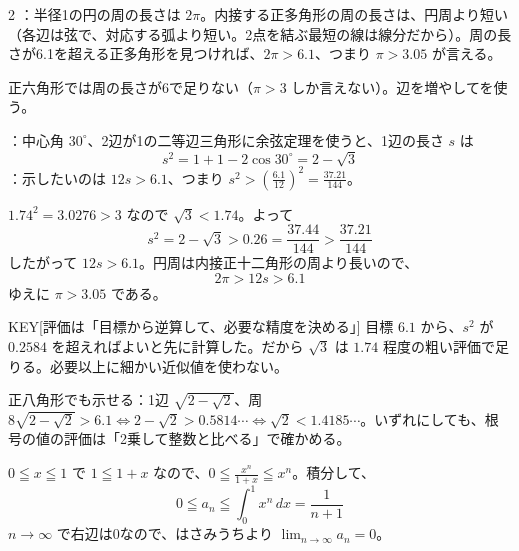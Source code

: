 \documentclass[paper=b5j, fontsize=8pt, fleqn, twoside]{jlreq}
\begin{document}
\begin{multicols*}{2}
  ：半径1の円の周の長さは $2\pi$。内接する正多角形の周の長さは、円周より短い（各辺は弦で、対応する弧より短い。2点を結ぶ最短の線は線分だから）。周の長さが6.1を超える正多角形を見つければ、$2\pi>6.1$、つまり $\pi>3.05$ が言える。\par
  正六角形では周の長さが6で足りない（$\pi>3$ しか言えない）。辺を増やしてを使う。

  \begin{zuhyo}
  \end{zuhyo}

  ：中心角 $30^\circ$、2辺が1の二等辺三角形に余弦定理を使うと、1辺の長さ $s$ は
  \[s^2=1+1-2\cos30^\circ=2-\sqrt3\]
  ：示したいのは $12s>6.1$、つまり $s^2>\left(\frac{6.1}{12}\right)^2=\frac{37.21}{144}$。\par
  $1.74^2=3.0276>3$ なので $\sqrt3<1.74$。よって
  \[s^2=2-\sqrt3>0.26=\frac{37.44}{144}>\frac{37.21}{144}\]
  したがって $12s>6.1$。円周は内接正十二角形の周より長いので、
  \[2\pi>12s>6.1\]
  ゆえに $\pi>3.05$ である。\QED

  \begin{ptbs}{KEY}[評価は「目標から逆算して、必要な精度を決める」]
    目標 $6.1$ から、$s^2$ が $0.2584$ を超えればよいと先に計算した。だから $\sqrt3$ は $1.74$ 程度の粗い評価で足りる。必要以上に細かい近似値を使わない。
  \end{ptbs}

  \begin{memo}
    正八角形でも示せる：1辺 $\sqrt{2-\sqrt2}$、周 $8\sqrt{2-\sqrt2}>6.1\iff2-\sqrt2>0.5814\cdots\iff\sqrt2<1.4185\cdots$。いずれにしても、根号の値の評価は「2乗して整数と比べる」で確かめる。
  \end{memo}

  $0\leqq x\leqq1$ で $1\leqq1+x$ なので、$0\leqq\frac{x^n}{1+x}\leqq x^n$。積分して、
  \[0\leqq a_n\leqq\int_0^1x^n\,dx=\frac1{n+1}\]
  $n\to\infty$ で右辺は0なので、はさみうちより $\displaystyle\lim_{n\to\infty}a_n=0$。\QED


\end{multicols*}
\end{document}
